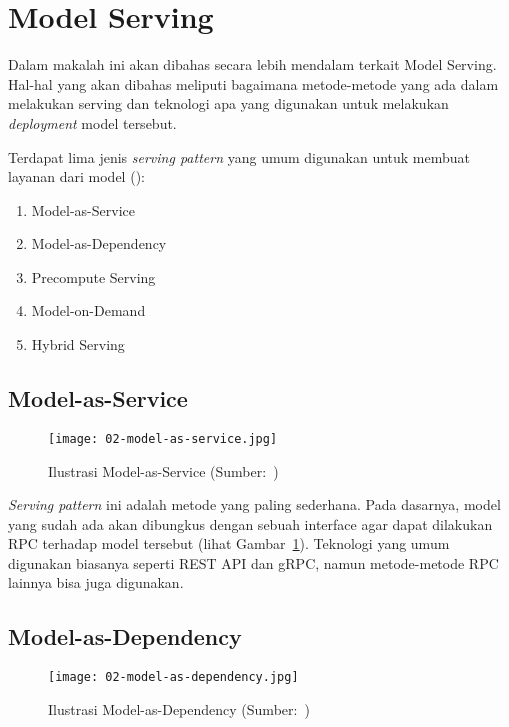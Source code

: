 \section{Model Serving}

Dalam makalah ini akan dibahas secara lebih mendalam terkait Model Serving.
Hal-hal yang akan dibahas meliputi bagaimana metode-metode yang ada dalam melakukan serving dan teknologi apa yang digunakan untuk melakukan \textit{deployment} model tersebut.

Terdapat lima jenis \textit{serving pattern} yang umum digunakan untuk membuat layanan dari model (\cite{mlopsorg}):
\begin{enumerate}
  \item Model-as-Service
  \item Model-as-Dependency
  \item Precompute Serving
  \item Model-on-Demand
  \item Hybrid Serving
\end{enumerate}

\subsection{Model-as-Service}

\begin{figure}
  \centering
  \texttt{[image: 02-model-as-service.jpg]}
  \caption{Ilustrasi Model-as-Service (Sumber:~\cite{book-handsonml})}\label{fig:model-as-service}
\end{figure}

\textit{Serving pattern} ini adalah metode yang paling sederhana.
Pada dasarnya, model yang sudah ada akan dibungkus dengan sebuah interface agar dapat dilakukan RPC terhadap model tersebut (lihat Gambar~\ref{fig:model-as-service}).
Teknologi yang umum digunakan biasanya seperti REST API dan gRPC, namun metode-metode RPC lainnya bisa juga digunakan.

\subsection{Model-as-Dependency}

\begin{figure}
  \centering
  \texttt{[image: 02-model-as-dependency.jpg]}
  \caption{Ilustrasi Model-as-Dependency (Sumber:~\cite{book-handsonml})}\label{fig:model-as-dependency}
\end{figure}

